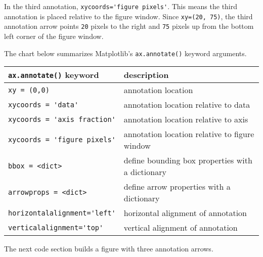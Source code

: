\documentclass{book}
\newcommand{\passthrough}[1]{#1}
\begin{document}
In the third annotation,
\passthrough{\lstinline!xycoords='figure pixels'!}. This means the third
annotation is placed relative to the figure window. Since
\passthrough{\lstinline!xy=(20, 75)!}, the third annotation arrow points
\passthrough{\lstinline!20!} pixels to the right and
\passthrough{\lstinline!75!} pixels up from the bottom left corner of
the figure window.

The chart below summarizes Matplotlib's
\passthrough{\lstinline!ax.annotate()!} keyword arguments.

\begin{longtable}[]{@{}ll@{}}
\toprule
\passthrough{\lstinline!ax.annotate()!} keyword &
description\tabularnewline
\midrule
\endhead
\passthrough{\lstinline!xy = (0,0)!} & annotation
location\tabularnewline
\passthrough{\lstinline!xycoords = 'data'!} & annotation location
relative to data\tabularnewline
\passthrough{\lstinline!xycoords = 'axis fraction'!} & annotation
location relative to axis\tabularnewline
\passthrough{\lstinline!xycoords = 'figure pixels'!} & annotation
location relative to figure window\tabularnewline
\passthrough{\lstinline!bbox = <dict>!} & define bounding box properties
with a dictionary\tabularnewline
\passthrough{\lstinline!arrowprops = <dict>!} & define arrow properties
with a dictionary\tabularnewline
\passthrough{\lstinline!horizontalalignment='left'!} & horizontal
alignment of annotation\tabularnewline
\passthrough{\lstinline!verticalalignment='top'!} & vertical alignment
of annotation\tabularnewline
\bottomrule
\end{longtable}

The next code section builds a figure with three annotation arrows.
    
\end{document}
